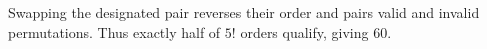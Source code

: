 Swapping the designated pair reverses their order and pairs valid and invalid permutations. Thus exactly half of $5!$ orders qualify, giving $\boxed{60}$.
